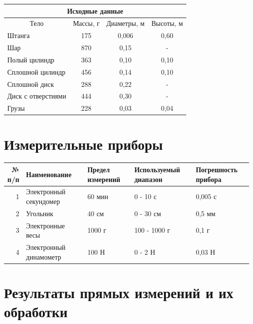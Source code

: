 \documentclass[a4paper,14pt]{article}
\begin{document}
    \begin{center}
        \begin{tabular}{|l|c|c|c|}
            \multicolumn{4}{c}{Исходные данные} \bigstrut[b]\\
            \hline
            \multicolumn{1}{|c|}{Тело} & Массы, г & Диаметры, м & Высоты, м \bigstrut\\
            \hline
            Штанга & 175   & 0,006 & 0,60 \bigstrut\\
            \hline
            Шар   & 870   & 0,15 & - \bigstrut\\
            \hline
            \multicolumn{1}{|p{6.335em}|}{Полый цилиндр} & 363   & 0,10 & 0,10 \bigstrut\\
            \hline
            \multicolumn{1}{|p{6.335em}|}{Сплошной цилиндр} & 456   & 0,14 & 0,10 \bigstrut\\
            \hline
            Сплошной диск  & 288   & 0,22 & - \bigstrut\\
            \hline
            Диск с отверстиями  & 444   & 0,30 & - \bigstrut\\
            \hline
            Грузы & 228  & 0,03 & 0,04 \bigstrut\\
            \hline
        \end{tabular}
    \end{center}

    \section{Измерительные приборы}

    \begin{tabular}{|r|p{12em}|p{10em}|p{7.5em}|p{6.5em}|}
        \hline		{№ п/п } & Наименование  & Предел измерений & Используемый диапазон & Погрешность прибора \\
        \hline		1 	  & Электронный секундомер & 60 мин & 0 - 10 с & 0,005 с \\
        \hline		2     & Угольник & 40 см & 0 - 30 см & 0,5 мм \\
        \hline		3     & Электронные весы & 1000 г & 100 - 1000 г &  0,1 г \\
        \hline		4     & Электронный динамометр & 100 Н & 0 - 2 Н & 0,03 Н \\
        \hline
    \end{tabular}%

    \section{Результаты прямых измерений и их обработки}
\end{document}
